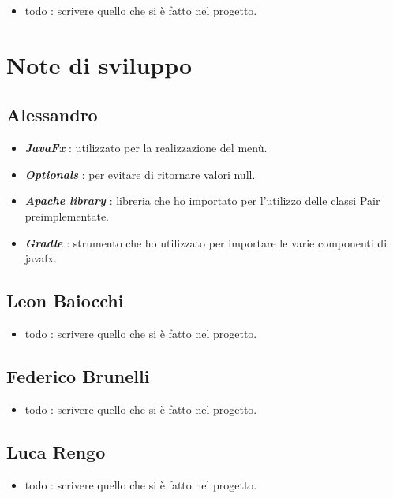 \begin{itemize}
	\item  todo : scrivere quello che si è fatto nel progetto.
\end{itemize}

\section{Note di sviluppo}

\subsection*{Alessandro}

\begin{itemize}
	\item  \textbf{\textit{JavaFx}} : utilizzato per la realizzazione del menù.
	\item \textbf{\textit{Optionals}} : per evitare di ritornare valori null.
	\item \textbf{\textit{Apache library}} : libreria che ho importato per l'utilizzo delle classi Pair preimplementate.
	\item \textbf{\textit{Gradle}} : strumento che ho utilizzato per importare le varie componenti di javafx.
\end{itemize}

\subsection*{Leon Baiocchi}

\begin{itemize}
	\item  todo : scrivere quello che si è fatto nel progetto.
\end{itemize}

\subsection*{Federico Brunelli}

\begin{itemize}
	\item  todo : scrivere quello che si è fatto nel progetto.
\end{itemize}

\subsection*{Luca Rengo}

\begin{itemize}
	\item  todo : scrivere quello che si è fatto nel progetto.
\end{itemize}